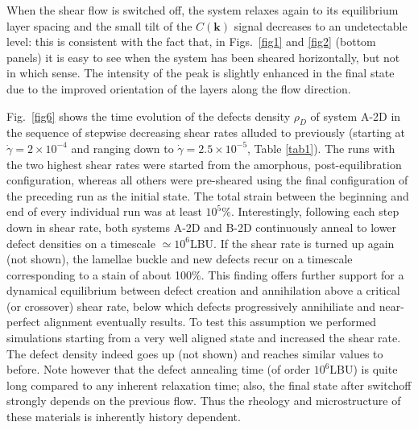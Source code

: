 \documentclass[8.5pt,twoside,twocolumn]{article}
\newcommand{\e}[1]{\times10^{#1}}
\newcommand{\gd}{\dot{\gamma}}
\begin{document}
When the shear flow is switched off, the system relaxes again to its equilibrium layer spacing and the small tilt of the $C({\bm k})$ signal decreases to an undetectable level: this is consistent with the fact that, in Figs.~\ref{fig1} and \ref{fig2} (bottom panels) it is easy to see when the system has been sheared horizontally, but not in which sense. The intensity of the peak is slightly enhanced in the final state due to the improved orientation of the layers along the flow direction.

Fig.~\ref{fig6} shows the time evolution of the defects density $\rho_D$ of system A-2D in the sequence of stepwise decreasing shear rates alluded to previously (starting at $\gd=2\e{-4}$ and ranging down to $\gd=2.5\e{-5}$, Table \ref{tab1}).
The runs with the two highest shear rates were started from the amorphous, post-equilibration configuration, whereas all others were pre-sheared using the final configuration of the preceding run as the initial state.
The total strain between the beginning and end of every individual run was at least $10^{5}\%$.
Interestingly, following each step down in shear rate, both systems A-2D and B-2D continuously anneal to lower defect densities on a timescale $\simeq 10^6$LBU. If the shear rate is turned up again (not shown), the lamellae buckle and new defects recur on a timescale corresponding to a stain of about 100\%. 
This finding offers further support for a dynamical equilibrium between defect creation and annihilation above a critical (or crossover) shear rate, below which defects progressively annihiliate and near-perfect alignment eventually results.
To test this assumption we performed simulations starting from a very well aligned state and increased the shear rate.
The defect density indeed goes up (not shown) and reaches similar values to before. Note however that the defect annealing time (of order $10^6$LBU) is quite long compared to any inherent relaxation time; also, the final state after switchoff strongly depends on the previous flow. Thus the rheology and microstructure of these materials is inherently history dependent.
\end{document}
